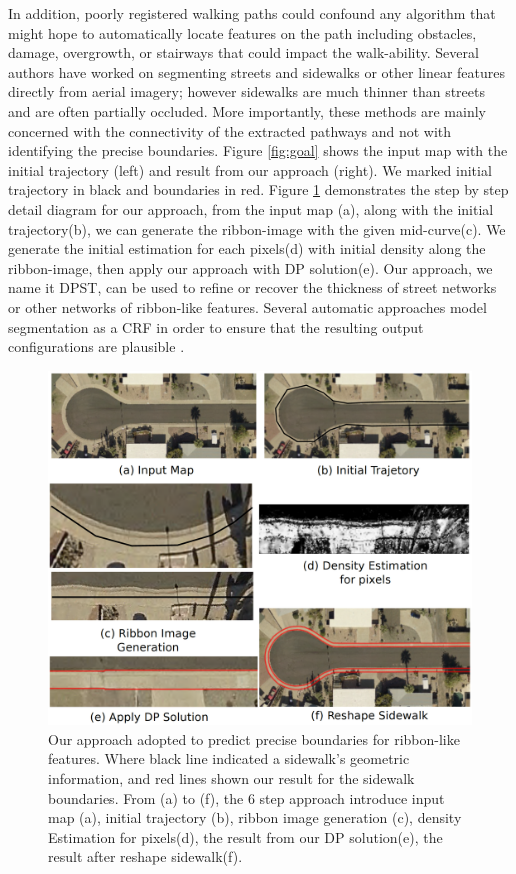 
In addition, poorly registered walking paths could confound any algorithm that might hope to automatically locate features on the path including obstacles, damage, overgrowth, or stairways that could impact the walk-ability. 
Several authors\cite{femiani2009interval, femiani2007road} have worked on segmenting streets and sidewalks or other linear features directly from aerial imagery; however sidewalks are much thinner than streets and are often partially occluded. 
More importantly, these methods are mainly concerned with the connectivity of the extracted pathways and not with identifying the precise boundaries. 
Figure \ref{fig:goal} shows the input map with the initial trajectory (left) and result from our approach (right).
We marked initial trajectory in black and boundaries in red.
Figure \ref{fig:fw_ov} demonstrates the step by step detail diagram for our approach, from the input map (a), along with the initial trajectory(b), we can generate the ribbon-image with the given mid-curve(c). 
We generate the initial estimation for each pixels(d) with initial density along the ribbon-image, then apply our approach with \ac{DP} solution(e). 
Our approach, we name it \ac{DPST}, can be used to refine or recover the thickness of street networks or other networks of ribbon-like features. Several automatic approaches model segmentation as a \ac{CRF} in order to ensure that the resulting output configurations are plausible \cite{ActiveContou09, Rother2004-ou, Achanta:149300}.

\begin{figure}[H]
    \centering
    \includegraphics[width=\textwidth]{Figures/diagram.png}
    \caption[Framework Demonstration]{
    Our approach adopted to predict precise boundaries for ribbon-like features. Where black line indicated a sidewalk's geometric information, and red lines shown our result for the sidewalk boundaries. From (a) to (f), the 6 step approach introduce input map (a), initial trajectory (b), ribbon image generation (c), density Estimation for pixels(d), the result from our \ac{DP} solution(e), the result after reshape sidewalk(f).}
    \label{fig:fw_ov}
\end{figure}

